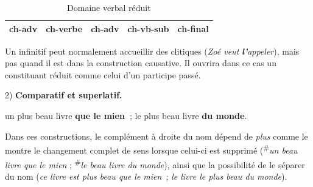 \begin{table}
\caption{\label{tab:}Domaine verbal réduit}
\def\arraystretch{1.5}
\setlength{\tabcolsep}{4ex}
\begin{tabular}{|c|c|c|c|c|}
\hline
ch-adv & \cellcolor{lsDOIGray} ch-verbe & ch-adv & ch-vb-sub & ch-final\\
\hline
\end{tabular}
\end{table}

Un infinitif peut normalement accueillir des clitiques (\textit{Zoé veut} \textbf{\textit{l’}}\textit{appeler}), mais pas quand il est dans la construction causative. Il ouvrira dans ce cas un constituant réduit comme celui d’un participe passé.

2) \textbf{Comparatif et superlatif.}

\ea
\ea
{un plus beau livre} \textbf{{que le mien~}};
\ex
 {le plus beau livre} \textbf{{du monde}}.
\z
\z

Dans ces constructions, le complément à droite du nom dépend de \textit{plus} comme le montre le changement complet de sens lorsque celui-ci est supprimé (\textsuperscript{\#}\textit{un beau livre que le mien} ; \textsuperscript{\#}\textit{le beau livre du monde}), ainsi que la possibilité de le séparer du nom (\textit{ce livre est plus beau que le mien~}; \textit{le livre le plus beau du monde}).

\begin{figure}
\caption{\label{fig:}}
\end{figure}

